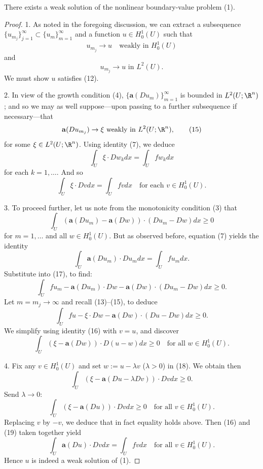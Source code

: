 \begin{theorem}
\label{thm:monotonicity-existence-weak-solution}
There exists a weak solution of the nonlinear boundary-value problem (1).
\end{theorem}
\begin{proof}
1. As noted in the foregoing discussion, we can extract a subsequence $\{u_{m_j}\}_{j=1}^\infty \subset \{u_m\}_{m=1}^\infty$ and a function $u \in H^1_0(U)$ such that
\[
u_{m_j} \to u \quad \text{weakly in } H^1_0(U)
\tag{13}
\]
and
\[
u_{m_j} \to u \text{ in } L^2(U).
\tag{14}
\]
We must show $u$ satisfies (12).

2. In view of the growth condition (4), $\{\mathbf{a}(Du_m)\}_{m=1}^\infty$ is bounded in $L^2(U;\R^n)$; and so we may as well suppose---upon passing to a further subsequence if necessary---that
\[
\mathbf{a}(Du_{m_j}) \to \xi \text{ weakly in } L^2(U;\R^n),
\tag{15}
\]
for some $\xi \in L^2(U;\R^n)$. Using identity (7), we deduce
\[
\int_U \xi \cdot Dw_k dx = \int_U fw_k dx
\]
for each $k = 1, \ldots$. And so
\[
\int_U \xi \cdot Dv dx = \int_U fv dx \quad \text{for each } v \in H_0^1(U).
\tag{16}
\]

3. To proceed further, let us note from the monotonicity condition (3) that
\[
\int_U (\mathbf{a}(Du_m) - \mathbf{a}(Dw)) \cdot (Du_m - Dw) dx \geq 0
\tag{17}
\]
for $m = 1, \ldots$ and all $w \in H_0^1(U)$. But as observed before, equation (7) yields the identity
\[
\int_U \mathbf{a}(Du_m) \cdot Du_m dx = \int_U fu_m dx.
\]
Substitute into (17), to find:
\[
\int_U fu_m - \mathbf{a}(Du_m) \cdot Dw - \mathbf{a}(Dw) \cdot (Du_m - Dw) dx \geq 0.
\]
Let $m = m_j \to \infty$ and recall (13)--(15), to deduce
\[
\int_U fu - \xi \cdot Dw - \mathbf{a}(Dw) \cdot (Du - Dw) dx \geq 0.
\]
We simplify using identity (16) with $v = u$, and discover
\[
\int_U (\xi - \mathbf{a}(Dw)) \cdot D(u - w) dx \geq 0 \quad \text{for all } w \in H_0^1(U).
\tag{18}
\]

4. Fix any $v \in H_0^1(U)$ and set $w := u - \lambda v$ ($\lambda > 0$) in (18). We obtain then
\[
\int_U (\xi - \mathbf{a}(Du - \lambda Dv)) \cdot Dv dx \geq 0.
\]
Send $\lambda \to 0$:
\[
\int_U (\xi - \mathbf{a}(Du)) \cdot Dv dx \geq 0 \quad \text{for all } v \in H_0^1(U).
\tag{19}
\]
Replacing $v$ by $-v$, we deduce that in fact equality holds above. Then (16) and (19) taken together yield
\[
\int_U \mathbf{a}(Du) \cdot Dv dx = \int_U fv dx \quad \text{for all } v \in H_0^1(U).
\]
Hence $u$ is indeed a weak solution of (1).
\end{proof}

